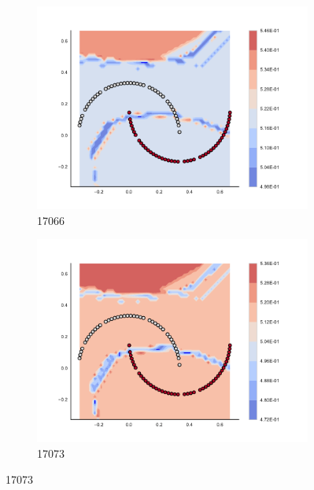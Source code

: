 \begin{figure}[h]
\begin{subfigure}[b]{0.09\textwidth}
    \includegraphics[clip, trim=2.35cm 1.75cm 4.5cm 0cm,width=\textwidth]{img/convergence/17066.pdf}
    \caption{17066}
    \label{fig:convergence_17066}
\end{subfigure}
%
\begin{subfigure}[b]{0.09\textwidth}
    \includegraphics[clip, trim=2.35cm 1.75cm 4.5cm 0cm,width=\textwidth]{img/convergence/17073.pdf}
    \caption{17073}
    \label{fig:convergence_17073}
\end{subfigure}
%
        \end{figure}
